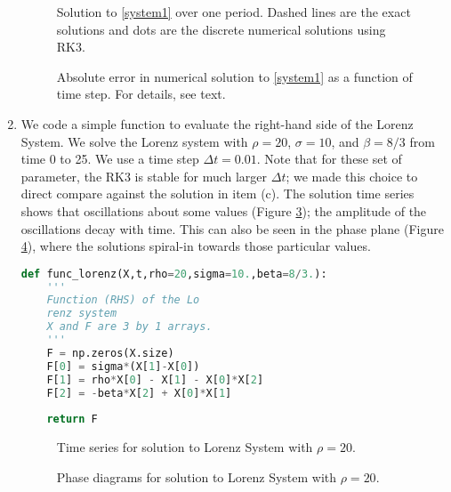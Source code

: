 \documentclass[11pt]{article}
\begin{document}
\begin{enumerate}[label=(\alph*)]
\begin{figure}[h]
\centerline{}
\caption{Solution to \eqref{system1} over one period. Dashed lines are the exact solutions and dots are the discrete numerical solutions using RK3.}
    \label{soln_system1}
\end{figure}

\begin{figure}[h]
\centerline{}
\caption{Absolute error in numerical solution to \eqref{system1} as a function of time step. For details, see text.}
    \label{error}
\end{figure}

\item We code a simple function to evaluate the right-hand side of the Lorenz System. We solve the Lorenz system with $\rho = 20$, $\sigma = 10$, and $\beta = 8/3$ from time 0 to 25. We use a time step $\Delta t = 0.01$. Note that for these set of parameter, the RK3 is stable for much larger $\Delta t$; we made this choice to direct compare against the solution in item (c). The solution time series shows that oscillations about some values (Figure \ref{lorenz_ts_1}); the amplitude of the oscillations decay with time. This can also be seen in the phase plane (Figure \ref{lorenz_phase_1}), where the solutions spiral-in towards those particular values.

\begin{lstlisting}[language=Python]
def func_lorenz(X,t,rho=20,sigma=10.,beta=8/3.):
    '''
    Function (RHS) of the Lo
    renz system
    X and F are 3 by 1 arrays.
    '''
    F = np.zeros(X.size)
    F[0] = sigma*(X[1]-X[0])
    F[1] = rho*X[0] - X[1] - X[0]*X[2]
    F[2] = -beta*X[2] + X[0]*X[1]
    
    return F
\end{lstlisting}

\begin{figure}[p]
\centerline{}
\caption{Time series for solution to Lorenz System with $\rho = 20$.}
    \label{lorenz_ts_1}
\end{figure}
 
\begin{figure}[p]
\centerline{}
\caption{Phase diagrams for solution to Lorenz System with $\rho = 20$.}
    \label{lorenz_phase_1}
\end{figure}
    

\end{enumerate}
\end{document}

